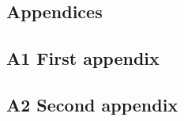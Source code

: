 \documentclass{book}
\begin{document}
\tableofcontents
\begin{appendices}
\appendixpage
\noappendicestocpagenum
\addappheadtotoc

\chapter{Appendices}
\section{A1 First appendix}
\section{A2 Second appendix}
\end{appendices}
\end{document}
